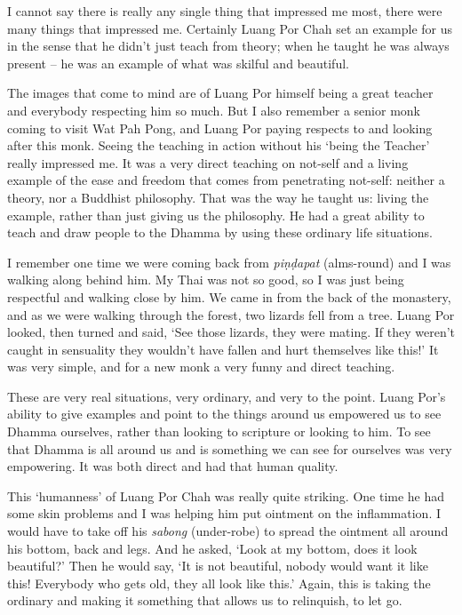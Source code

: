 I cannot say there is really any single thing that impressed me most, 
there were many things that impressed me. Certainly Luang Por Chah set
an example for us in the sense that he didn't just teach from theory; 
when he taught he was always present -- he was an example of what was
skilful and beautiful. 

The images that come to mind are of Luang Por himself being a great
teacher and everybody respecting him so much. But I also remember a
senior monk coming to visit Wat Pah Pong, and Luang Por paying respects
to and looking after this monk. Seeing the teaching in action without
his `being the Teacher' really impressed me. It was a very direct
teaching on not-self and a living example of the ease and freedom that
comes from penetrating not-self: neither a theory, nor a Buddhist
philosophy. That was the way he taught us: living the example, rather
than just giving us the philosophy. He had a great ability to teach and
draw people to the Dhamma by using these ordinary life situations. 

I remember one time we were coming back from \emph{piṇḍapat} (alms-round)
and I was walking along behind him. My Thai was not so good, so I
was just being respectful and walking close by him. We came in from the
back of the monastery, and as we were walking through the forest, two
lizards fell from a tree. Luang Por looked, then turned and said, `See
those lizards, they were mating. If they weren't caught in sensuality
they wouldn't have fallen and hurt themselves like this!' It was very
simple, and for a new monk a very funny and direct teaching. 

These are very real situations, very ordinary, and very to the point. 
Luang Por's ability to give examples and point to the things around us
empowered us to see Dhamma ourselves, rather than looking to scripture
or looking to him. To see that Dhamma is all around us and is something
we can see for ourselves was very empowering. It was both direct and had
that human quality. 

This `humanness' of Luang Por Chah was really quite striking. One time
he had some skin problems and I was helping him put ointment on the
inflammation. I would have to take off his \emph{sabong} (under-robe) to
spread the ointment all around his bottom, back and legs. And he asked, 
`Look at my bottom, does it look beautiful?' Then he would say, `It is
not beautiful, nobody would want it like this! Everybody who gets old, 
they all look like this.' Again, this is taking the ordinary and making
it something that allows us to relinquish, to let go. 

